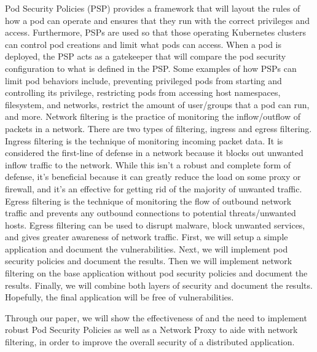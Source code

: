 Pod Security Policies (PSP) provides a framework that will layout the rules
of how a pod can operate and ensures that they run with the correct
privileges and access. Furthermore, PSPs are used so that those operating
Kubernetes clusters can control pod creations and limit what pods can access.
When a pod is deployed, the PSP acts as a gatekeeper that will compare the
pod security configuration to what is defined in the PSP. Some examples of how
PSPs can limit pod behaviors include, preventing privileged pods from starting
and controlling its privilege, restricting pods from accessing host namespaces,
filesystem, and networks, restrict the amount of user/groups that a pod can run,
and more.
Network filtering is the practice of monitoring the inflow/outflow of packets in
a network. There are two types of filtering, ingress and egress filtering.
Ingress filtering is the technique of monitoring incoming packet data.
It is considered the first-line of defense in a network because it blocks
out unwanted inflow traffic to the network. While this isn't a robust and complete
form of defense, it's beneficial because it can greatly reduce the load on some proxy
or firewall, and it's an effective for getting rid of the majority of unwanted traffic.
Egress filtering is the technique of monitoring the flow of outbound network traffic and
prevents any outbound connections to potential threats/unwanted hosts. Egress filtering
can be used to disrupt malware, block unwanted services, and gives greater awareness of
network traffic.
First, we will setup a simple application and document the vulnerabilities.
Next, we will implement pod security policies and document the results.
Then we will implement network filtering on the base application without pod security policies
and document the results. Finally, we will combine both layers of security and document the results.
Hopefully, the final application will be free of vulnerabilities.

Through our paper, we will show the effectiveness of and the need to implement robust Pod Security Policies
as well as a Network Proxy to aide with network filtering, in order to improve the overall security of a
distributed application. 
